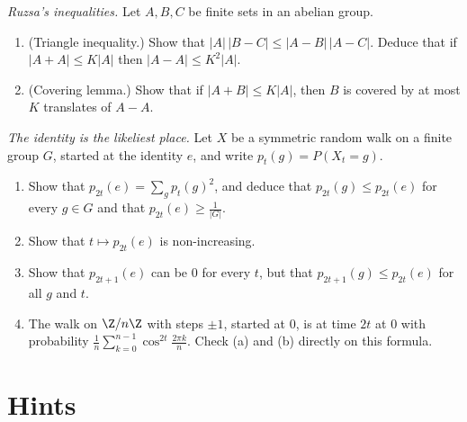 \begin{exercise}[$\star\star$]\label{pb:ruzsa}
\emph{Ruzsa's inequalities.} Let $A,B,C$ be finite sets in an abelian group.
\begin{enumerate}[label=(\alph*)]
\item (Triangle inequality.) Show that $|A|\,|B-C|\le|A-B|\,|A-C|$. Deduce that if $|A+A|\le K|A|$ then $|A-A|\le K^2|A|$.
\item (Covering lemma.) Show that if $|A+B|\le K|A|$, then $B$ is covered by at most $K$ translates of $A-A$.
\end{enumerate}
\end{exercise}

\begin{exercise}[$\star\star$]\label{pb:returnbound}
\emph{The identity is the likeliest place.} Let $X$ be a symmetric random walk on a finite group $G$, started at the identity $e$,
and write $p_t(g)=P(X_t=g)$.
\begin{enumerate}[label=(\alph*)]
\item Show that $p_{2t}(e)=\sum_{g}p_t(g)^2$, and deduce that $p_{2t}(g)\le p_{2t}(e)$ for every $g\in G$ and that $p_{2t}(e)\ge\frac1{|G|}$.
\item Show that $t\mapsto p_{2t}(e)$ is non-increasing.
\item Show that $p_{2t+1}(e)$ can be $0$ for every $t$, but that $p_{2t+1}(g)\le p_{2t}(e)$ for all $g$ and $t$.
\item The walk on $\Z/n\Z$ with steps $\pm1$, started at $0$, is at time $2t$ at $0$ with probability $\frac1n\sum_{k=0}^{n-1}\cos^{2t}\frac{2\pi k}n$. Check (a) and
(b) directly on this formula.
\end{enumerate}
\end{exercise}

\section{Hints}

